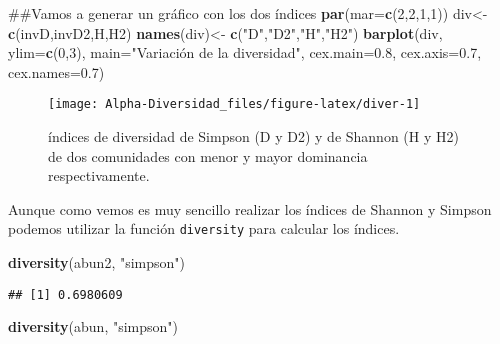 \documentclass[]{book}
\newenvironment{Shaded}{\begin{snugshade}}{\end{snugshade}}
\newcommand{\KeywordTok}[1]{\textcolor[rgb]{0.13,0.29,0.53}{\textbf{{#1}}}}
\newcommand{\DataTypeTok}[1]{\textcolor[rgb]{0.13,0.29,0.53}{{#1}}}
\newcommand{\DecValTok}[1]{\textcolor[rgb]{0.00,0.00,0.81}{{#1}}}
\newcommand{\FloatTok}[1]{\textcolor[rgb]{0.00,0.00,0.81}{{#1}}}
\newcommand{\StringTok}[1]{\textcolor[rgb]{0.31,0.60,0.02}{{#1}}}
\newcommand{\NormalTok}[1]{{#1}}
\begin{document}
\begin{Shaded}
\begin{Highlighting}[]
\NormalTok{##Vamos a generar un gráfico con los dos índices}
\KeywordTok{par}\NormalTok{(}\DataTypeTok{mar=}\KeywordTok{c}\NormalTok{(}\DecValTok{2}\NormalTok{,}\DecValTok{2}\NormalTok{,}\DecValTok{1}\NormalTok{,}\DecValTok{1}\NormalTok{))}
\NormalTok{div<-}\StringTok{ }\KeywordTok{c}\NormalTok{(invD,invD2,H,H2)}
\KeywordTok{names}\NormalTok{(div)<-}\StringTok{ }\KeywordTok{c}\NormalTok{(}\StringTok{"D"}\NormalTok{,}\StringTok{"D2"}\NormalTok{,}\StringTok{"H"}\NormalTok{,}\StringTok{"H2"}\NormalTok{)}
\KeywordTok{barplot}\NormalTok{(div, }\DataTypeTok{ylim=}\KeywordTok{c}\NormalTok{(}\DecValTok{0}\NormalTok{,}\DecValTok{3}\NormalTok{), }\DataTypeTok{main=}\StringTok{"Variación de la diversidad"}\NormalTok{,}
        \DataTypeTok{cex.main=}\FloatTok{0.8}\NormalTok{, }\DataTypeTok{cex.axis=}\FloatTok{0.7}\NormalTok{, }\DataTypeTok{cex.names=}\FloatTok{0.7}\NormalTok{)}
\end{Highlighting}
\end{Shaded}

\begin{figure}

{\centering \texttt{[image: Alpha-Diversidad\_files/figure-latex/diver-1]} 

}

\caption{índices de diversidad de Simpson (D y D2)  y de Shannon (H y H2) de dos comunidades con menor y mayor dominancia respectivamente.}\label{fig:diver}
\end{figure}

Aunque como vemos es muy sencillo realizar los índices de Shannon y
Simpson podemos utilizar la función \texttt{diversity} para calcular los
índices.

\begin{Shaded}
\begin{Highlighting}[]
\KeywordTok{diversity}\NormalTok{(abun2, }\StringTok{"simpson"}\NormalTok{)}
\end{Highlighting}
\end{Shaded}

\begin{verbatim}
## [1] 0.6980609
\end{verbatim}

\begin{Shaded}
\begin{Highlighting}[]
\KeywordTok{diversity}\NormalTok{(abun, }\StringTok{"simpson"}\NormalTok{)}
\end{Highlighting}
\end{Shaded}
\end{document}
